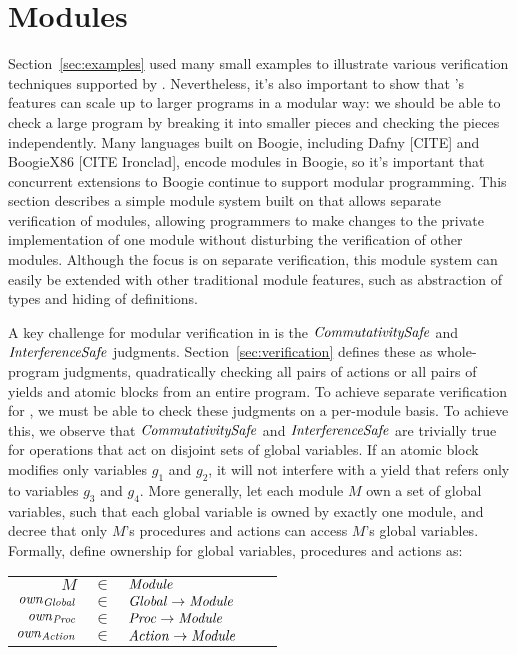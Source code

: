 \section{Modules}
\label{sec:modules}

Section~\ref{sec:examples} used many small examples to illustrate various verification techniques supported by \civl.
Nevertheless, it's also important to show that \civl's features can scale up to larger programs in a modular way:
we should be able to check a large program by breaking it into smaller pieces and checking the pieces independently.
Many languages built on Boogie, including Dafny [CITE] and BoogieX86 [CITE Ironclad], encode modules in Boogie,
so it's important that concurrent extensions to Boogie continue to support modular programming.
This section describes a simple module system built on \civl that allows separate verification of modules,
allowing programmers to make changes to the private implementation of one module
without disturbing the verification of other modules.
Although the focus is on separate verification,
this module system can easily be extended with other traditional module features,
such as abstraction of types and hiding of definitions.

A key challenge for modular verification in \civl is the $\mathit{CommutativitySafe}$ and $\mathit{InterferenceSafe}$ judgments.
Section~\ref{sec:verification} defines these as whole-program judgments,
quadratically checking all pairs of actions or all pairs of yields and atomic blocks from an entire program.
To achieve separate verification for \civl,
we must be able to check these judgments on a per-module basis.
To achieve this,
we observe that $\mathit{CommutativitySafe}$ and $\mathit{InterferenceSafe}$ are trivially true for operations that act on disjoint sets of global variables.
If an atomic block modifies only variables $g_1$ and $g_2$, it will not interfere with a yield that refers only to variables $g_3$ and $g_4$.
More generally, let each module $M$ own a set of global variables, such that each global variable is owned by exactly one module,
and decree that only $M$'s procedures and actions can access $M$'s global variables.
Formally, define ownership for global variables, procedures and actions as:

\hspace{10mm}\begin{tabular}{rclcl}
$M$ & $\in$ & $\mathit{Module}$ \\
$\mathit{own}_{\mathit{Global}}$ & $\in$ & $\mathit{Global} \rightarrow \mathit{Module}$ \\
$\mathit{own}_{\mathit{Proc}}$ & $\in$ & $\mathit{Proc} \rightarrow \mathit{Module}$ \\
$\mathit{own}_{\mathit{Action}}$ & $\in$ & $\mathit{Action} \rightarrow \mathit{Module}$ \\
\end{tabular}

